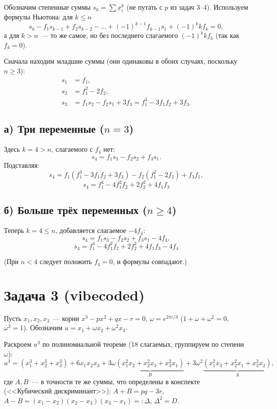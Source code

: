 \documentclass[12pt]{article}
\begin{document}
	Обозначим степенные суммы $s_k = \sum x_i^k$ (не путать с $p$ из задач 3--4). Используем формулы Ньютона: для $k\leqslant n$
	\[
	s_k-f_1s_{k-1}+f_2s_{k-2}-\dots+(-1)^{k-1}f_{k-1}s_1+(-1)^kkf_k=0,
	\]
	а для $k>n$~--- то же самое, но без последнего слагаемого $(-1)^kkf_k$ (так как $f_k=0$).
	
	Сначала находим младшие суммы (они одинаковы в обоих случаях, поскольку $n\geqslant3$):
	\begin{align*}
	s_1&=f_1,\\
	s_2&=f_1^2-2f_2,\\
	s_3&=f_1s_2-f_2s_1+3f_3=f_1^3-3f_1f_2+3f_3.
	\end{align*}
	
	\subsection*{а) Три переменные ($n=3$)}
	
	Здесь $k=4>n$, слагаемого с $f_4$ нет:
	\[
	s_4=f_1s_3-f_2s_2+f_3s_1.
	\]
	Подставляя:
	\[
	s_4=f_1(f_1^3-3f_1f_2+3f_3)-f_2(f_1^2-2f_2)+f_3f_1,
	\]
	\[
	\boxed{s_4=f_1^4-4f_1^2f_2+2f_2^2+4f_1f_3}
	\]
	
	\subsection*{б) Больше трёх переменных ($n\geqslant4$)}
	
	Теперь $k=4\leqslant n$, добавляется слагаемое $-4f_4$:
	\[
	s_4=f_1s_3-f_2s_2+f_3s_1-4f_4,
	\]
	\[
	\boxed{s_4=f_1^4-4f_1^2f_2+2f_2^2+4f_1f_3-4f_4}
	\]
	
	(При $n<4$ следует положить $f_4=0$, и формулы совпадают.)
	
	\section*{Задача 3 (vibecoded)}
	
	Пусть $x_1,x_2,x_3$~--- корни $x^3-px^2+qx-r=0$, $\omega=e^{2\pi i/3}$ ($1+\omega+\omega^2=0$, $\omega^3=1$). Обозначим $u=x_1+\omega x_2+\omega^2x_3$.
	
	Раскроем $u^3$ по полиномиальной теореме (18 слагаемых, группируем по степени $\omega$):
	\[
	u^3=(x_1^3+x_2^3+x_3^3)+6x_1x_2x_3+3\omega\underbrace{(x_1^2x_2+x_2^2x_3+x_3^2x_1)}_{B}+3\omega^2\underbrace{(x_1^2x_3+x_2^2x_1+x_3^2x_2)}_{A},
	\]
	где $A,B$~--- в точности те же суммы, что определены в конспекте (<<Кубический дискриминант>>): $A+B=pq-3r$, $A-B=(x_1-x_2)(x_2-x_3)(x_3-x_1)=:\Delta$, $\Delta^2=D$.
	
\end{document}
